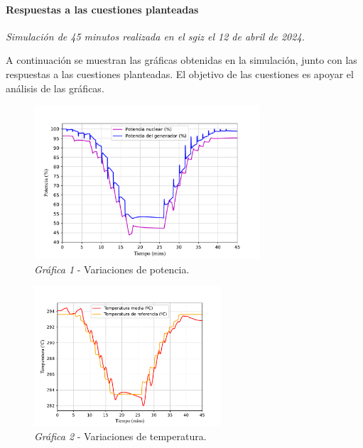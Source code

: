 \paragraph{Respuestas a las cuestiones planteadas} \label{respuestas_cuestiones_planteadas}

\textit{Simulación de 45 minutos realizada en el \acrshort{sgiz} el 12 de abril de 2024.}

A continuación se muestran las gráficas obtenidas en la simulación, junto con las respuestas a las cuestiones planteadas. El objetivo de las cuestiones es apoyar el análisis de las gráficas. 

\begin{figure}[!h]
  \centering
  \includegraphics[width=0.75\textwidth]{content/figures/sim1_potencias.pdf}
  \caption{\textit{Gráfica 1} - Variaciones de potencia.}
  \label{fig:sim1_potencias}
\end{figure}

\begin{figure}[!h]
  \centering
  \vspace{-0.3cm}
  \includegraphics[width=0.62\textwidth]{content/figures/sim1_temperaturas.pdf}
  \vspace{-0.3cm}
  \caption{\textit{Gráfica 2} - Variaciones de temperatura.}
  \label{fig:sim1_temperaturas}
\end{figure}

